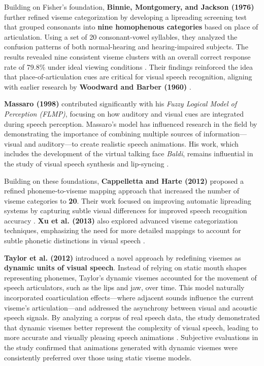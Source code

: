 \documentclass[12pt]{article}
\begin{document}
Building on Fisher’s foundation, \textbf{Binnie, Montgomery, and Jackson (1976)} further refined viseme categorization by developing a lipreading screening test that grouped consonants into \textbf{nine homophenous categories} based on place of articulation. Using a set of 20 consonant-vowel syllables, they analyzed the confusion patterns of both normal-hearing and hearing-impaired subjects. The results revealed nine consistent viseme clusters with an overall correct response rate of 79.8\% under ideal viewing conditions \cite{Binnie1976VisualRehabilitation}. Their findings reinforced the idea that place-of-articulation cues are critical for visual speech recognition, aligning with earlier research by \textbf{Woodward and Barber (1960)} \cite{WOODWARD1960PhonemeLipreading}.

\textbf{Massaro (1998)} contributed significantly with his \textit{Fuzzy Logical Model of Perception (FLMP)}, focusing on how auditory and visual cues are integrated during speech perception. Massaro's model has influenced research in the field by demonstrating the importance of combining multiple sources of information—visual and auditory—to create realistic speech animations. His work, which includes the development of the virtual talking face \textit{Baldi}, remains influential in the study of visual speech synthesis and lip-syncing \cite{Massaro1998PerceivingPrinciple}.

Building on these foundations, \textbf{Cappelletta and Harte (2012)} proposed a refined phoneme-to-viseme mapping approach that increased the number of viseme categories to \textbf{20}. Their work focused on improving automatic lipreading systems by capturing subtle visual differences for improved speech recognition accuracy \cite{Cappelletta2012Phoneme-to-visemeRecognition}. \textbf{Xu et al. (2013)} also explored advanced viseme categorization techniques, emphasizing the need for more detailed mappings to account for subtle phonetic distinctions in visual speech \cite{Xu2013AGames}.

\textbf{Taylor et al. (2012)} introduced a novel approach by redefining visemes as \textbf{dynamic units of visual speech}. Instead of relying on static mouth shapes representing phonemes, Taylor’s dynamic visemes accounted for the movement of speech articulators, such as the lips and jaw, over time. This model naturally incorporated coarticulation effects—where adjacent sounds influence the current viseme’s articulation—and addressed the asynchrony between visual and acoustic speech signals. By analyzing a corpus of real speech data, the study demonstrated that dynamic visemes better represent the complexity of visual speech, leading to more accurate and visually pleasing speech animations \cite{Taylor2012DynamicSpeech}. Subjective evaluations in the study confirmed that animations generated with dynamic visemes were consistently preferred over those using static viseme models.
\end{document}
